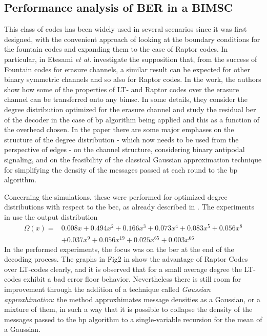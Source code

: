 \subsection{Performance analysis of BER in a BIMSC}
This class of codes has been widely used in several scenarios since it was first designed, with the convenient approach of looking at the boundary conditions for the fountain codes and expanding them to the case of Raptor codes. In particular, in \cite{Etesami2006} Etesami \textit{et al.} investigate the supposition that, from the success of Fountain codes for erasure channels, a similar result can be expected for other binary symmetric channels and so also for Raptor codes. In the work, the authors show how some of the properties of LT- and Raptor codes over the erasure channel can be transferred onto any \gls{bimsc}. In some details, they consider the degree distribution optimized for the erasure channel and study the residual \gls{ber} of the decoder in the case of \gls{bp} algorithm being applied and this as a function of the overhead chosen. In the paper there are some major emphases on the structure of the degree distribution - which now needs to be used from the perspective of edges - on the channel structure, considering binary antipodal signaling, and on the feasibility of the classical Gaussian approximation technique for simplifying the density of the messages passed at each round to the \gls{bp} algorithm.

Concerning the simulations, these were performed for optimized degree distributions with respect to the \gls{bec}, as already described in \cite{Shokrollahi2006}. The experiments in \cite{Etesami2006} use the output distribution
\begin{align}
  \Omega(x) =&0.008x + 0.494x^2 + 0.166x^3 + 0.073x^4 + 0.083x^5 + 0.056x^8\\
             &+ 0.037x^9 + 0.056x^{19} + 0.025x^{65} + 0.003x^{66}
\end{align}
In the performed experiments, the focus was on the \gls{ber} at the end of the decoding process. The graphs in Fig2 in \cite{Etesami2006} show the advantage of Raptor Codes over LT-codes clearly, and it is observed that for a small average degree the LT-codes exhibit a bad error floor behavior. Nevertheless there is still room for improvement through the addition of a technique called \textit{Gaussian approxhimation}: the method approxhimates message densities as a Gaussian, or a mixture of them, in such a way that it is possible to collapse the density of the messages passed to the \gls{bp} algorithm to a single-variable recursion for the mean of a Gaussian.
